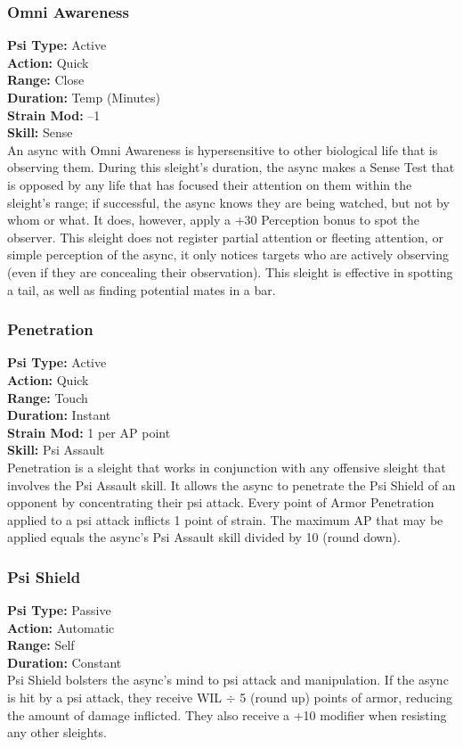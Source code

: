 \subsubsection{Omni Awareness}
\textbf{Psi Type:} Active \\ 
\textbf{Action:} Quick \\ 
\textbf{Range:} Close \\ 
\textbf{Duration:} Temp (Minutes) \\
\textbf{Strain Mod:} –1 \\ 
\textbf{Skill:} Sense\\
An async with Omni Awareness is hypersensitive to
other biological life that is observing them. During
this sleight’s duration, the async makes a Sense Test
that is opposed by any life that has focused their attention
on them within the sleight’s range; if successful,
the async knows they are being watched, but not
by whom or what. It does, however, apply a +30 Perception
bonus to spot the observer. This sleight does
not register partial attention or fleeting attention, or
simple perception of the async, it only notices targets
who are actively observing (even if they are concealing
their observation). This sleight is effective in spotting a
tail, as well as finding potential mates in a bar.

\subsubsection{Penetration}
\textbf{Psi Type:} Active \\ 
\textbf{Action:} Quick \\ 
\textbf{Range:} Touch \\ 
\textbf{Duration:} Instant \\
\textbf{Strain Mod:} 1 per AP point \\ 
\textbf{Skill:} Psi Assault \\
Penetration is a sleight that works in conjunction with
any offensive sleight that involves the Psi Assault skill.
It allows the async to penetrate the Psi Shield of an opponent
by concentrating their psi attack. Every point
of Armor Penetration applied to a psi attack inflicts
1 point of strain. The maximum AP that may be applied
equals the async’s Psi Assault skill divided by 10
(round down).

\subsubsection{Psi Shield}
\textbf{Psi Type:} Passive \\ 
\textbf{Action:} Automatic \\ 
\textbf{Range:} Self \\ 
\textbf{Duration:} Constant \\
Psi Shield bolsters the async’s mind to psi attack and
manipulation. If the async is hit by a psi attack, they
receive WIL $\div$ 5 (round up) points of armor, reducing
the amount of damage inflicted. They also receive a
+10 modifier when resisting any other sleights.

